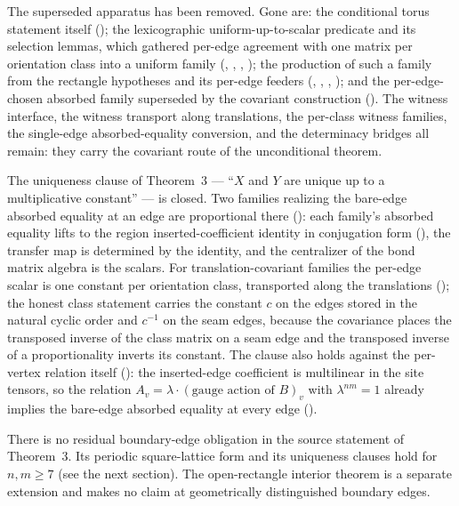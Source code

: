 \documentclass{article}
\begin{document}
The superseded apparatus has been removed. Gone are: the conditional torus
statement itself (); the lexicographic
uniform-up-to-scalar predicate and its selection lemmas, which gathered per-edge
agreement with one matrix per orientation class into a uniform family
(,
, ,
); the production of such a family from the
rectangle hypotheses and its per-edge feeders
(,
,
,
); and the per-edge-chosen absorbed family
superseded by the covariant construction
(). The witness interface, the witness
transport along translations, the per-class witness families, the single-edge
absorbed-equality conversion, and the determinacy bridges all remain: they carry
the covariant route of the unconditional theorem.

The uniqueness clause of Theorem~3 --- ``$X$ and $Y$ are unique up to a
multiplicative constant'' --- is closed. Two families realizing the bare-edge
absorbed equality at an edge are proportional there
(): each family's absorbed equality lifts to
the region inserted-coefficient identity in conjugation form
(), the transfer map is determined by the
identity, and the centralizer of the bond matrix algebra is the scalars. For
translation-covariant families the per-edge scalar is one constant per orientation
class, transported along the translations
(); the honest class statement
carries the constant $c$ on the edges stored in the natural cyclic order and
$c^{-1}$ on the seam edges, because the covariance places the transposed inverse of
the class matrix on a seam edge and the transposed inverse of a proportionality
inverts its constant. The clause also holds against the per-vertex relation itself
(): the inserted-edge coefficient is
multilinear in the site tensors, so the relation $A_v = \lambda\cdot(\text{gauge
        action of }B)_v$ with $\lambda^{nm}=1$ already implies the bare-edge absorbed
equality at every edge ().

There is no residual boundary-edge obligation in the source statement of
Theorem~3. Its periodic square-lattice form and its uniqueness clauses hold for
$n,m\geq 7$ (see the next section). The open-rectangle interior theorem is a
separate extension and makes no claim at geometrically distinguished boundary
edges.
\end{document}
